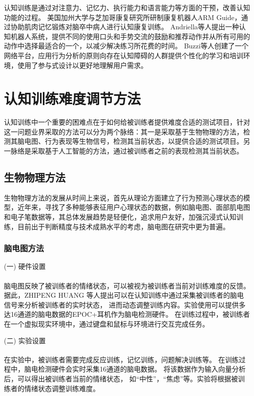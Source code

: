 \documentclass{article}
\begin{document}
        认知训练是通过对注意力、记忆力、执行能力和语言能力等方面的干预，改善认知功能的过程。
        美国加州大学与芝加哥康复研究所研制康复机器人ARM Guide，通过协助肌肉记忆锻炼对脑卒中病人进行认知康复训练。
        Andriella等人\cite{ref5}提出一种认知机器人系统，提供不同的使用口头和手势交流的鼓励和推荐动作并从所有可用的动作中选择最适合的一个，以减少解决练习所花费的时间。
        Buzzi等人\cite{ref6}创建了一个网络平台，应用行为分析的原则向存在认知障碍的人群提供个性化的学习和培训环境，使用了参与式设计以更好地理解用户需求。
            \section{认知训练难度调节方法}
            认知训练中一个重要的困难点在于如何给被训练者提供难度合适的测试项目，针对这一问题业界采取的方法可以分为两个脉络：其一是采取基于生物物理的方法，检测其脑电图、行为表现等生物信号，检测其当前状态，以提供合适的测试项目。另一脉络是采取基于人工智能的方法，通过被训练者之前的表现检测其当前状态。
        \subsection{生物物理方法}
        生物物理方法的发展从时间上来说，首先从理论方面建立了行为预测心理状态的模型\cite{ref7}，近年来，寻找了多种能够表征用户心理状态的数据，例如脑电图\cite{ref8}、面部肌电图和电子笔数据等，其总体发展趋势是轻便化，追求用户友好，加强沉浸式认知训练，目前出于判断精度与技术成熟水平的考虑，脑电图在研究中更为普遍。
            \subsubsection{脑电图方法}
            (一) 硬件设置\paragraph{}
            脑电图反映了被训练者的情绪状态，可以被视为被训练者当前对训练难度的反馈。
            据此，ZHIPENG HUANG \cite{ref9}等人提出可以在认知训练中通过采集被训练者的脑电信号来分析被训练者的实时状态，
            进而动态调整训练内容。实验使用可以提供多达16通道的脑电数据的EPOC+耳机作为脑电检测硬件。
            在训练过程中，被训练者在一个虚拟现实环境中，通过键盘和鼠标与环境进行交互完成任务。

            (二) 实验设置\paragraph{}
            在实验中，被训练者需要完成反应训练，记忆训练，问题解决训练等。
            在训练过程中，脑电检测硬件会实时采集16通道的脑电数据。
            将该数据作为输入向量分析后，可以得出被训练者当前的情绪状态，
            如“中性”，“焦虑”等。实验将根据被训练者的情绪状态调整训练难度。
\end{document}
